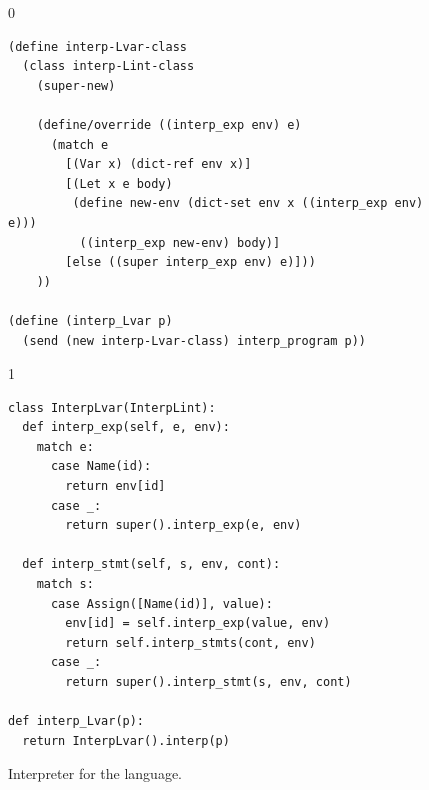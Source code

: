 \documentclass[7x10]{TimesAPriori_MIT}%
\def\racketEd{0}
\def\pythonEd{1}
\providecommand{\BookEdition}{1}
\let\edition\BookEdition
\newcommand{\pythonColor}[0]{}
\numberwithin{theorem}{chapter}
\numberwithin{definition}{chapter}
\numberwithin{equation}{chapter}
\begin{document}
\begin{figure}[tp]
\begin{tcolorbox}[colback=white]
{\if\edition\racketEd
\begin{lstlisting}
(define interp-Lvar-class
  (class interp-Lint-class
    (super-new)
    
    (define/override ((interp_exp env) e)
      (match e
        [(Var x) (dict-ref env x)]
        [(Let x e body)
         (define new-env (dict-set env x ((interp_exp env) e)))
          ((interp_exp new-env) body)]
        [else ((super interp_exp env) e)]))
    ))

(define (interp_Lvar p)
  (send (new interp-Lvar-class) interp_program p))
\end{lstlisting}
\fi}
{\if\edition\pythonEd\pythonColor
\begin{lstlisting}
class InterpLvar(InterpLint):
  def interp_exp(self, e, env):
    match e:
      case Name(id):
        return env[id]
      case _:
        return super().interp_exp(e, env)

  def interp_stmt(self, s, env, cont):
    match s:
      case Assign([Name(id)], value):
        env[id] = self.interp_exp(value, env)
        return self.interp_stmts(cont, env)
      case _:
        return super().interp_stmt(s, env, cont)

def interp_Lvar(p):
  return InterpLvar().interp(p)
\end{lstlisting}
\fi}
\end{tcolorbox}
\caption{Interpreter for the \LangVar{} language.}
\label{fig:interp-Lvar}
\end{figure}
\end{document}

